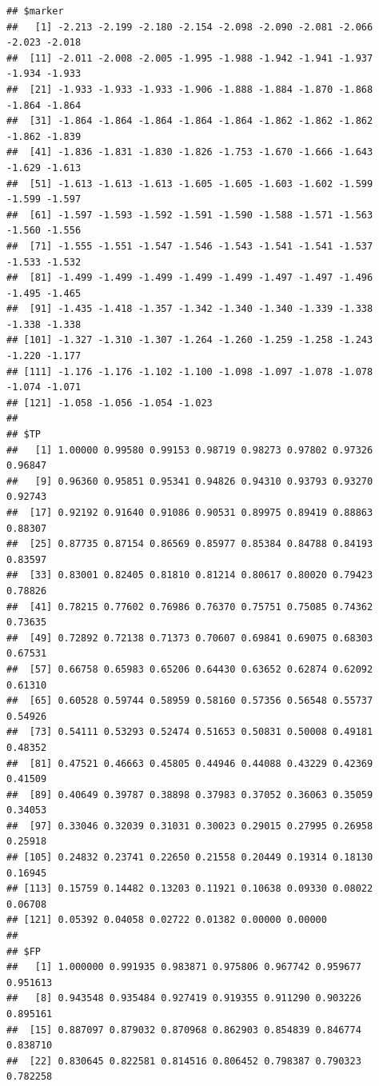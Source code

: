 \documentclass{article}\usepackage[]{graphicx}\usepackage[]{color}
\makeatletter
\newenvironment{kframe}{%
 \def\at@end@of@kframe{}%
 \ifinner\ifhmode%
  \def\at@end@of@kframe{\end{minipage}}%
  \begin{minipage}{\columnwidth}%
 \fi\fi%
 \def\FrameCommand##1{\hskip\@totalleftmargin \hskip-\fboxsep
 \colorbox{shadecolor}{##1}\hskip-\fboxsep
     \hskip-\linewidth \hskip-\@totalleftmargin \hskip\columnwidth}%
 \MakeFramed {\advance\hsize-\width
   \@totalleftmargin\z@ \linewidth\hsize
   \@setminipage}}%
 {\par\unskip\endMakeFramed%
 \at@end@of@kframe}
\newenvironment{knitrout}{}{} %
\makeatother
\begin{document}
\begin{knitrout}
{}


\begin{kframe}\begin{verbatim}
## $marker
##   [1] -2.213 -2.199 -2.180 -2.154 -2.098 -2.090 -2.081 -2.066 -2.023 -2.018
##  [11] -2.011 -2.008 -2.005 -1.995 -1.988 -1.942 -1.941 -1.937 -1.934 -1.933
##  [21] -1.933 -1.933 -1.933 -1.906 -1.888 -1.884 -1.870 -1.868 -1.864 -1.864
##  [31] -1.864 -1.864 -1.864 -1.864 -1.864 -1.862 -1.862 -1.862 -1.862 -1.839
##  [41] -1.836 -1.831 -1.830 -1.826 -1.753 -1.670 -1.666 -1.643 -1.629 -1.613
##  [51] -1.613 -1.613 -1.613 -1.605 -1.605 -1.603 -1.602 -1.599 -1.599 -1.597
##  [61] -1.597 -1.593 -1.592 -1.591 -1.590 -1.588 -1.571 -1.563 -1.560 -1.556
##  [71] -1.555 -1.551 -1.547 -1.546 -1.543 -1.541 -1.541 -1.537 -1.533 -1.532
##  [81] -1.499 -1.499 -1.499 -1.499 -1.499 -1.497 -1.497 -1.496 -1.495 -1.465
##  [91] -1.435 -1.418 -1.357 -1.342 -1.340 -1.340 -1.339 -1.338 -1.338 -1.338
## [101] -1.327 -1.310 -1.307 -1.264 -1.260 -1.259 -1.258 -1.243 -1.220 -1.177
## [111] -1.176 -1.176 -1.102 -1.100 -1.098 -1.097 -1.078 -1.078 -1.074 -1.071
## [121] -1.058 -1.056 -1.054 -1.023
## 
## $TP
##   [1] 1.00000 0.99580 0.99153 0.98719 0.98273 0.97802 0.97326 0.96847
##   [9] 0.96360 0.95851 0.95341 0.94826 0.94310 0.93793 0.93270 0.92743
##  [17] 0.92192 0.91640 0.91086 0.90531 0.89975 0.89419 0.88863 0.88307
##  [25] 0.87735 0.87154 0.86569 0.85977 0.85384 0.84788 0.84193 0.83597
##  [33] 0.83001 0.82405 0.81810 0.81214 0.80617 0.80020 0.79423 0.78826
##  [41] 0.78215 0.77602 0.76986 0.76370 0.75751 0.75085 0.74362 0.73635
##  [49] 0.72892 0.72138 0.71373 0.70607 0.69841 0.69075 0.68303 0.67531
##  [57] 0.66758 0.65983 0.65206 0.64430 0.63652 0.62874 0.62092 0.61310
##  [65] 0.60528 0.59744 0.58959 0.58160 0.57356 0.56548 0.55737 0.54926
##  [73] 0.54111 0.53293 0.52474 0.51653 0.50831 0.50008 0.49181 0.48352
##  [81] 0.47521 0.46663 0.45805 0.44946 0.44088 0.43229 0.42369 0.41509
##  [89] 0.40649 0.39787 0.38898 0.37983 0.37052 0.36063 0.35059 0.34053
##  [97] 0.33046 0.32039 0.31031 0.30023 0.29015 0.27995 0.26958 0.25918
## [105] 0.24832 0.23741 0.22650 0.21558 0.20449 0.19314 0.18130 0.16945
## [113] 0.15759 0.14482 0.13203 0.11921 0.10638 0.09330 0.08022 0.06708
## [121] 0.05392 0.04058 0.02722 0.01382 0.00000 0.00000
## 
## $FP
##   [1] 1.000000 0.991935 0.983871 0.975806 0.967742 0.959677 0.951613
##   [8] 0.943548 0.935484 0.927419 0.919355 0.911290 0.903226 0.895161
##  [15] 0.887097 0.879032 0.870968 0.862903 0.854839 0.846774 0.838710
##  [22] 0.830645 0.822581 0.814516 0.806452 0.798387 0.790323 0.782258

\end{verbatim}
\end{kframe}
\end{knitrout}
\end{document}

